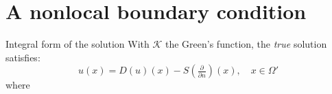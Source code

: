 \documentclass{beamer}
\begin{document}
\section{A nonlocal boundary condition}

\begin{frame}{Integral form of the solution}
With $\mathcal{K}$ the Green's function, the \emph{true} solution satisfies:
  \begin{equation*}
      u(x) = D(u)(x) - S(\tfrac{\partial}{\partial n})(x), \quad x \in\Omega'
  \end{equation*}
  where
\end{frame}
\end{document}
